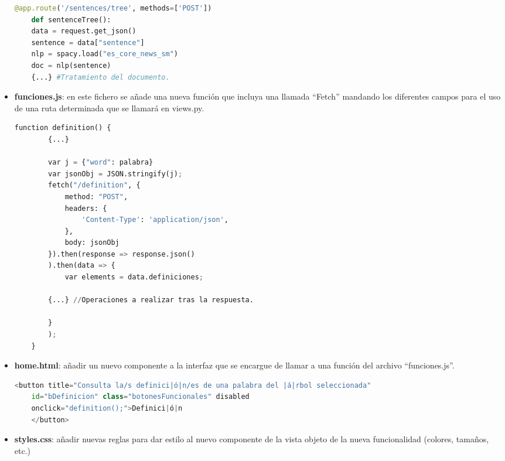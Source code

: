 \begin{itemize}
\begin{lstlisting}[language=python,firstnumber=1]
	@app.route('/sentences/tree', methods=['POST'])
	def sentenceTree():
	data = request.get_json()
	sentence = data["sentence"]
	nlp = spacy.load("es_core_news_sm")
	doc = nlp(sentence)
	{...} #Tratamiento del documento.
\end{lstlisting}

	
	\item \textbf{funciones.js}: en este fichero se añade una nueva función que incluya una llamada ``Fetch'' mandando los diferentes campos para el uso de una ruta determinada que se llamará en views.py. 
	
	\begin{lstlisting}[language=python,firstnumber=1]
	function definition() {
		{...}
		
		var j = {"word": palabra}
		var jsonObj = JSON.stringify(j);
		fetch("/definition", {
			method: "POST",
			headers: {
				'Content-Type': 'application/json',
			},
			body: jsonObj
		}).then(response => response.json()
		).then(data => {
			var elements = data.definiciones;
			
		{...} //Operaciones a realizar tras la respuesta.
			
		}
		);		
	}
	\end{lstlisting}
	
	
	
	
	
	\item \textbf{home.html}: añadir un nuevo componente a la interfaz que se encargue de llamar a una función del archivo ``funciones.js''. 
		\begin{lstlisting}[language=python,firstnumber=1]
	<button title="Consulta la/s definici|ó|n/es de una palabra del |á|rbol seleccionada"
	id="bDefinicion" class="botonesFuncionales" disabled
	onclick="definition();">Definici|ó|n
	</button>
	\end{lstlisting}
	\item \textbf{styles.css}: añadir nuevas reglas para dar estilo al nuevo componente de la vista objeto de la nueva funcionalidad (colores, tamaños, etc.)
\end{itemize}
